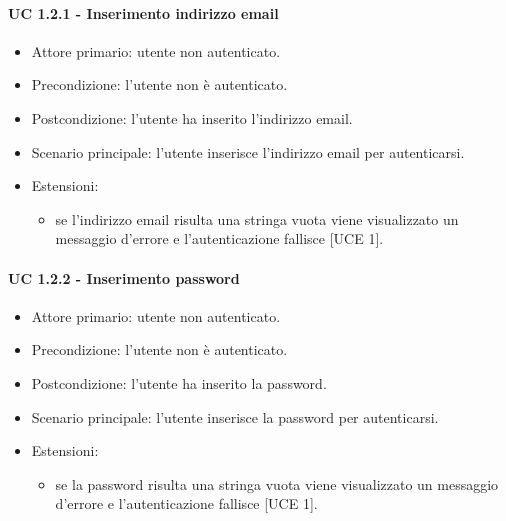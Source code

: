         \paragraph{UC 1.2.1 - Inserimento indirizzo email}
            \begin{itemize}
                \item Attore primario: utente non autenticato.
                \item Precondizione: l'utente non è autenticato.
                \item Postcondizione: l'utente ha inserito l'indirizzo email.
                \item Scenario principale: l'utente inserisce l'indirizzo email per autenticarsi.
                \item Estensioni:
                    \begin{itemize}
                        \item se l'indirizzo email risulta una stringa vuota viene visualizzato un messaggio d'errore e l'autenticazione fallisce [UCE 1].
                    \end{itemize}
            \end{itemize}
        \paragraph{UC 1.2.2 - Inserimento password}
            \begin{itemize}
                \item Attore primario: utente non autenticato.
                \item Precondizione: l'utente non è autenticato.
                \item Postcondizione: l'utente ha inserito la password.
                \item Scenario principale: l'utente inserisce la password per autenticarsi.
                \item Estensioni:
                    \begin{itemize}
                        \item se la password risulta una stringa vuota viene visualizzato un messaggio d'errore e l'autenticazione fallisce [UCE 1].
                    \end{itemize}
            \end{itemize}
